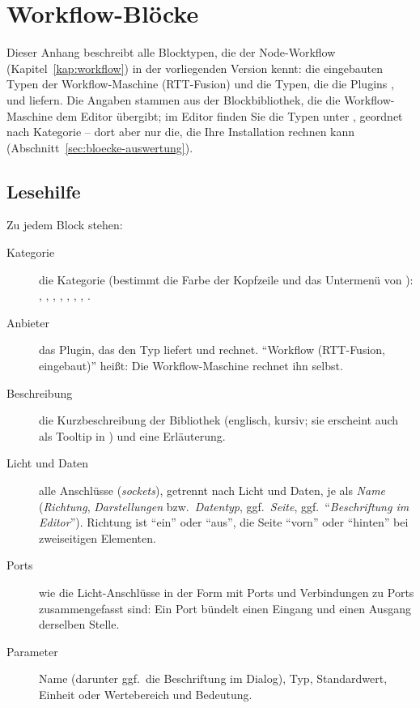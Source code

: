 \chapter{Workflow-Blöcke}\label{kap:workflow-bloecke}

Dieser Anhang beschreibt alle Blocktypen, die der Node-Workflow (Kapitel~\ref{kap:workflow})
in der vorliegenden Version kennt: die eingebauten Typen der Workflow-Maschine (RTT-Fusion) und die
Typen, die die Plugins ,  und  liefern. Die Angaben stammen
aus der Blockbibliothek, die die Workflow-Maschine dem Editor übergibt; im Editor finden Sie
die Typen unter , geordnet nach Kategorie -- dort aber nur die, die Ihre
Installation rechnen kann (Abschnitt~\ref{sec:bloecke-auswertung}).

\section{Lesehilfe}\label{sec:bloecke-lesehilfe}

Zu jedem Block stehen:

\begin{description}
  \item[Kategorie] die Kategorie (bestimmt die Farbe der Kopfzeile und das Untermenü von
        ): , , , ,
        , , , .
  \item[Anbieter] das Plugin, das den Typ liefert und rechnet. \enquote{Workflow (RTT-Fusion,
        eingebaut)} heißt: Die Workflow-Maschine rechnet ihn selbst.
  \item[Beschreibung] die Kurzbeschreibung der Bibliothek (englisch, kursiv; sie erscheint auch
        als Tooltip in ) und eine Erläuterung.
  \item[Licht und Daten] alle Anschlüsse (\emph{sockets}), getrennt nach Licht und Daten, je
        als \textit{Name} (\textit{Richtung}, \textit{Darstellungen} bzw.\ \textit{Datentyp},
        ggf.\ \textit{Seite}, ggf.\ \enquote{\textit{Beschriftung im Editor}}). Richtung ist
        \enquote{ein} oder \enquote{aus}, die Seite \enquote{vorn} oder \enquote{hinten} bei
        zweiseitigen Elementen.
  \item[Ports] wie die Licht-Anschlüsse in der Form mit Ports und Verbindungen zu Ports
        zusammengefasst sind: Ein Port bündelt einen Eingang und einen Ausgang derselben Stelle.
  \item[Parameter] Name (darunter ggf.\ die Beschriftung im Dialog), Typ, Standardwert,
        Einheit oder Wertebereich und Bedeutung.
\end{description}

